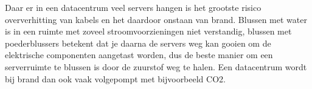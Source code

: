 Daar er in een datacentrum veel servers hangen is het grootste risico oververhitting van kabels en het daardoor onstaan van brand. Blussen met water is in een ruimte met zoveel stroomvoorzieningen niet verstandig, blussen met poederblussers betekent dat je daarna de servers weg kan gooien om de elektrische componenten aangetast worden, dus de beste manier om een serverruimte te blussen is door de zuurstof weg te halen. Een datacentrum wordt bij brand dan ook vaak volgepompt met bijvoorbeeld CO2.
